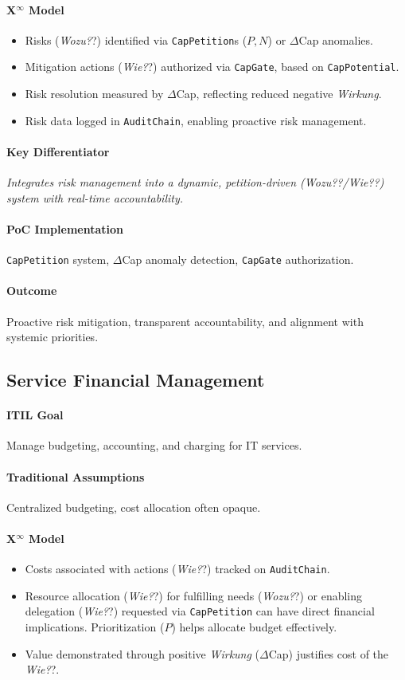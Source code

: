\documentclass[12pt, a4paper]{scrartcl}
\newcommand{\Xinf}{X$^\infty$}                        %
\newcommand{\DeltaCap}{$\Delta$Cap}                    %
\newcommand{\CapPotential}{\texttt{CapPotential}}    %
\newcommand{\Wirkung}{\textit{Wirkung}}                 %
\newcommand{\CapGate}{\texttt{CapGate}}
\newcommand{\AuditChain}{\texttt{AuditChain}}
\newcommand{\CapPetition}{\texttt{CapPetition}}        %
\newcommand{\Wozu}{\textit{Wozu?}}                      %
\newcommand{\Wie}{\textit{Wie?}}                        %
\begin{document}
\paragraph*{\Xinf{} Model}
\begin{itemize}
    \item Risks (\Wozu?) identified via \CapPetition{}s ($P, N$) or \DeltaCap{} anomalies.
    \item Mitigation actions (\Wie?) authorized via \CapGate{}, based on \CapPotential{}.
    \item Risk resolution measured by \DeltaCap{}, reflecting reduced negative \Wirkung{}.
    \item Risk data logged in \AuditChain{}, enabling proactive risk management.
\end{itemize}
\paragraph{Key Differentiator} \textit{Integrates risk management into a dynamic, petition-driven (\Wozu?/\Wie?) system with real-time accountability.}
\paragraph{PoC Implementation} \CapPetition{} system, \DeltaCap{} anomaly detection, \CapGate{} authorization.
\paragraph{Outcome} Proactive risk mitigation, transparent accountability, and alignment with systemic priorities.

\subsection{Service Financial Management} %
\paragraph{ITIL Goal} Manage budgeting, accounting, and charging for IT services.
\paragraph{Traditional Assumptions} Centralized budgeting, cost allocation often opaque.
\paragraph*{\Xinf{} Model}
\begin{itemize}
    \item Costs associated with actions (\Wie?) tracked on \AuditChain{}.
    \item Resource allocation (\Wie?) for fulfilling needs (\Wozu?) or enabling delegation (\Wie?) requested via \CapPetition{} can have direct financial implications. Prioritization ($P$) helps allocate budget effectively.
    \item Value demonstrated through positive \Wirkung{} (\DeltaCap{}) justifies cost of the \Wie?.
\end{itemize}
\end{document}
